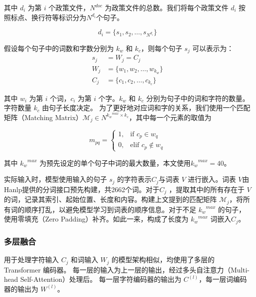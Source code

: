 \documentclass[12pt, a4paper]{ctexart}
\begin{document}
其中 $d_i$ 为第 $i$ 个政策文件，${N^{doc}}$ 为政策文件的总数。我们将每个政策文件 $d_i$ 按照标点、换行符等标识分为$N^{d_i}$个句子。 

\begin{equation}
   d_i = \{s_1, s_2, \dots, s_{N^{d_i}}\} 
\end{equation}

假设每个句子中的词数和字数分别为 $k_w$ 和 $k_c$，则每个句子 $s_j$ 可以表示为：
\begin{equation}
    \begin{split}
        s_j &= W_j = C_j \\
        W_j &= \{w_1, w_2, \dots, w_{k_w}\} \\
        C_j &= \{c_1, c_2, \dots, c_{k_c}\}
    \end{split}
\end{equation}

其中 $w_i$ 为第 $i$ 个词，$c_i$ 为第 $i$ 个字。$k_w$ 和 $k_c$ 分别为句子中的词和字符的数量。字符数量 $k_c$ 由句子长度决定。
为了更好地对应词和字的关系，我们使用一个匹配矩阵（Matching Matrix）${\mathcal{M}}_j  \in N^{{k_w}^{max} \times k_c}$，其中每一个元素的取值为

\begin{equation}
    m_{pq} = \begin{cases}
        1, & \text{if } c_p \in w_q \\
        0, & \text{elif } c_p \notin w_q
    \end{cases}
\end{equation}

其中 ${k_w}^{max}$ 为预先设定的单个句子中词的最大数量，本文使用${k_w}^{max}=40$。

实际输入时，模型使用输入的句子 $s_j$ 的字符表示$C_j$与词表 $V$ 进行嵌入。词表 $V$由Hanlp提供的分词接口预先构建，共2662个词。对于$C_j$ ，提取其中的所有存在于 $V$ 的词，记录其索引、起始位置、长度和内容。构建上文提到的匹配矩阵 ${\mathcal{M}}_j$，将所有词的顺序打乱，以避免模型学习到词表的顺序信息。对于不足 ${k_w}^{max}$ 的句子，使用零填充（Zero Padding）补齐。如此一来，构成了长度为 ${k_w}^{max}$ 词嵌入$C_j$。

\subsubsection{多层融合}
用于处理字符输入 $C_j$ 和词输入 $W_j$ 的模型架构相似，均使用了多层的 Transformer 编码器。
每一层的输入为上一层的输出，经过多头自注意力（Multi-head Self-Attention）处理后。
每一层字符编码器的输出为 $C^{(l)}$，每一层词编码器的输出为 $W^{(l)}$。
\end{document}
